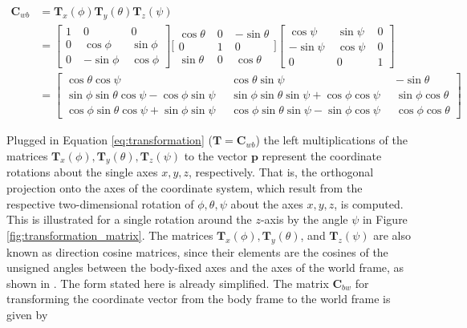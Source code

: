 \begin{equation}\label{eq:transformation_matrices}
\begin{split}
\mathbf{C}_{wb} & = \mathbf{T}_x(\phi) \mathbf{T}_y(\theta) \mathbf{T}_z(\psi) \\
 & = {\left[ \begin{smallmatrix}
    1 \; & 0 \; & 0 \\
    0 \; & \cos \phi \; & \sin \phi \\
    0 \; & -\sin \phi \; & \cos \phi
    \end{smallmatrix}\right]}
    {\bigg[ \begin{smallmatrix}
    \cos \theta \; & 0 \; & -\sin \theta \\
    0 \; & 1 \; & 0 \\
    \sin \theta \; & 0 \; & \cos \theta
    \end{smallmatrix} \bigg]}
    {\left[\begin{smallmatrix}
    \cos \psi \; & \sin \psi \; & 0 \\
    -\sin \psi \; & \cos \psi \; & 0 \\
    0 \; & 0 \; & 1
    \end{smallmatrix}\right]}\\
 & = {\left[\begin{smallmatrix}
   \cos \theta \cos \psi \; &
    \cos \theta \sin \psi \; &
   -\sin \theta \\
    \sin \phi \sin \theta \cos \psi - \cos \phi \sin \psi \;\; &
    \sin \phi \sin \theta \sin \psi + \cos \phi \cos \psi \;\; &
    \sin \phi \cos \theta \\
    \cos \phi \sin \theta \cos \psi + \sin \phi \sin \psi \;\; &
    \cos \phi \sin \theta \sin \psi - \sin \phi \cos \psi \;\; &
    \cos \phi \cos \theta
  \end{smallmatrix}\right]}
\end{split}
\end{equation}

\noindent
Plugged in Equation \ref{eq:transformation} ($\mathbf{T} = \mathbf{C}_{wb}$) the left multiplications of the matrices $\mathbf{T}_x(\phi), \mathbf{T}_y(\theta), \mathbf{T}_z(\psi)$ to the vector $\mathbf{p}$ represent the coordinate rotations about the single axes $x, y, z$, respectively. That is, the orthogonal projection onto the axes of the coordinate system, which result from the respective two-dimensional rotation of $\phi, \theta, \psi$ about the axes $x, y, z$, is computed. This is illustrated for a single rotation around the $z$-axis by the angle $\psi$ in Figure \ref{fig:transformation_matrix}. The matrices $\mathbf{T}_x(\phi), \mathbf{T}_y(\theta)$, and $\mathbf{T}_z(\psi)$ are also known as direction cosine matrices, since their elements are the cosines of the unsigned angles between the body-fixed axes and the axes of the world frame, as shown in \cite{diebel2006attitude}. The form stated here is already simplified. The matrix $\mathbf{C}_{bw}$ for transforming the coordinate vector from the body frame to the world frame is given by

